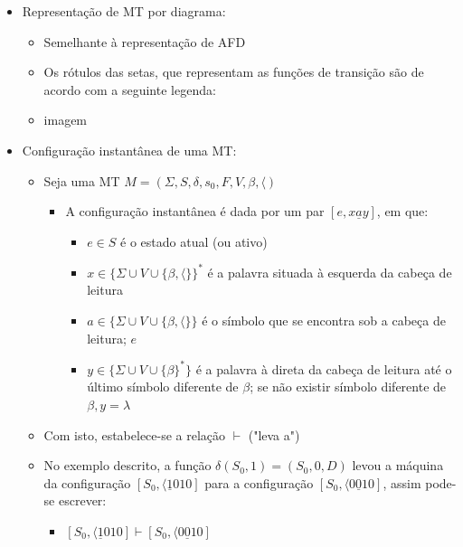 \documentclass[12pt]{article}
\begin{document}
\begin{itemize}
\begin{itemize}
        lançado na própria fita
    \end{itemize}
    \item Representação de MT por diagrama:
    \begin{itemize}
        \item Semelhante à representação de AFD
        \item Os rótulos das setas, que representam as funções de transição 
        são de acordo com a seguinte legenda:
        \item[] imagem
    \end{itemize}
    \item Configuração instantânea de uma MT:
    \begin{itemize}
        \item Seja uma MT $M=(\Sigma, S, \delta, s_0, F, V, \beta, \langle)$
        \begin{itemize}
            \item A configuração instantânea é dada por um par 
            $[e,x\underline{a}y]$, em que:
            \begin{itemize}
                \item $e \in S$ é o estado atual (ou ativo)
                \item $x \in \{\Sigma \cup V \cup \{\beta, \langle\}\}^*$ 
                é a palavra situada à esquerda da cabeça de leitura
                \item $a \in \{\Sigma \cup V \cup \{\beta, \langle\}\}$ é 
                o símbolo que se encontra sob a cabeça de leitura; $e$
                \item $y \in \{\Sigma \cup V \cup \{\beta\}^*\}$ é a palavra 
                à direta da cabeça de leitura até o último símbolo diferente 
                de $\beta$; se não existir símbolo diferente de 
                $\beta, y = \lambda$
            \end{itemize}
        \end{itemize}
        \item Com isto, estabelece-se a relação $\vdash$ ("leva a")
        \item No exemplo descrito, a função $\delta(S_0,1)=(S_0,0,D)$ levou a 
        máquina da configuração $[S_0,\langle\underline{1}010]$ para a 
        configuração $[S_0,\langle0\underline{0}10]$, assim pode-se escrever: 
        \begin{itemize}
            \item $[S_0,\langle\underline{1}010] \vdash 
                   [S_0,\langle0\underline{0}10]$

\end{itemize}
\end{itemize}
\end{itemize}
\end{document}
